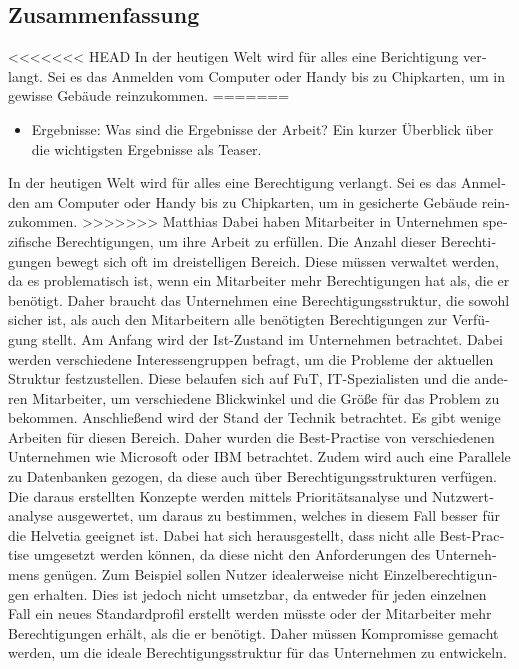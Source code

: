 \begin{otherlanguage}{ngerman}
	\chapter*{Zusammenfassung}
<<<<<<< HEAD
In der heutigen Welt wird für alles eine Berichtigung verlangt.
Sei es das Anmelden vom Computer oder Handy bis zu Chipkarten, um in gewisse Gebäude reinzukommen.
=======
	\begin{itemize}
          \item Ergebnisse: Was sind die Ergebnisse der Arbeit? Ein kurzer Überblick über die wichtigsten Ergebnisse als Teaser.
	\end{itemize}
In der heutigen Welt wird für alles eine Berechtigung verlangt.
Sei es das Anmelden am Computer oder Handy bis zu Chipkarten, um in gesicherte Gebäude reinzukommen.
>>>>>>> Matthias
Dabei haben Mitarbeiter in Unternehmen spezifische Berechtigungen, um ihre Arbeit zu erfüllen.
Die Anzahl dieser Berechtigungen bewegt sich oft im dreistelligen Bereich.
Diese müssen verwaltet werden, da es problematisch ist, wenn ein Mitarbeiter mehr Berechtigungen hat als, die er benötigt.
Daher braucht das Unternehmen eine Berechtigungsstruktur, die sowohl sicher ist, als auch den Mitarbeitern alle benötigten Berechtigungen zur Verfügung stellt.
\newline
Am Anfang wird der Ist-Zustand im Unternehmen betrachtet.
Dabei werden verschiedene Interessengruppen befragt, um die Probleme der aktuellen Struktur festzustellen.
Diese belaufen sich auf \ac{FuT}, IT-Spezialisten und die anderen Mitarbeiter, um verschiedene Blickwinkel und die Größe für das Problem zu bekommen.
Anschließend wird der Stand der Technik betrachtet.
Es gibt wenige Arbeiten für diesen Bereich.
Daher wurden die Best-Practise von verschiedenen Unternehmen wie Microsoft oder IBM betrachtet.
Zudem wird auch eine Parallele zu Datenbanken gezogen, da diese auch über Berechtigungsstrukturen verfügen.
Die daraus erstellten Konzepte werden mittels Prioritätsanalyse und Nutzwertanalyse ausgewertet, um daraus zu bestimmen, welches in diesem Fall besser für die Helvetia geeignet ist.
\newline
Dabei hat sich herausgestellt, dass nicht alle Best-Practise umgesetzt werden können, da diese nicht den Anforderungen des Unternehmens genügen.
Zum Beispiel sollen Nutzer idealerweise nicht Einzelberechtigungen erhalten.
Dies ist jedoch nicht umsetzbar, da entweder für jeden einzelnen Fall ein neues Standardprofil erstellt werden müsste oder der Mitarbeiter mehr Berechtigungen erhält, als die er benötigt.
Daher müssen Kompromisse gemacht werden, um die ideale Berechtigungsstruktur für das Unternehmen zu entwickeln.
\end{otherlanguage}
